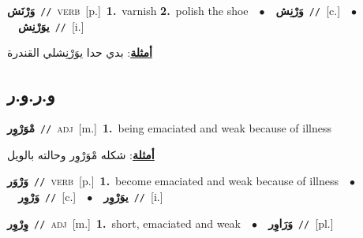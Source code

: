 \documentclass[10pt,a4paper,twoside]{article} %
\begin{document}
\begin{multicols}{2}
{\setlength\topsep{0pt}\textbf{\foreignlanguage{arabic}{وَرْنَش}}\ {\color{gray}\texttt{//}\color{black}}\ \textsc{verb}\ [p.]\ \textbf{1.}~varnish  \textbf{2.}~polish the shoe\ \ $\bullet$\ \ \setlength\topsep{0pt}\textbf{\foreignlanguage{arabic}{وَرْنِش}}\ {\color{gray}\texttt{//}\color{black}}\ [c.]\ \ $\bullet$\ \ \setlength\topsep{0pt}\textbf{\foreignlanguage{arabic}{يوَرْنِش}}\ {\color{gray}\texttt{//}\color{black}}\ [i.]\  \begin{flushright}\color{gray}\foreignlanguage{arabic}{\textbf{\underline{\foreignlanguage{arabic}{أمثلة}}}: بدي حدا يوَرْنِشلي القندرة}\end{flushright}\color{black}} \vspace{2mm}

\vspace{-3mm}
\subsection*{\color{blue}\foreignlanguage{arabic}{و.ر.و.ر}\color{blue}{}} 

{\setlength\topsep{0pt}\textbf{\foreignlanguage{arabic}{مْوَرْوِر}}\ {\color{gray}\texttt{//}\color{black}}\ \textsc{adj}\ [m.]\ \textbf{1.}~being emaciated and weak because of illness\  \begin{flushright}\color{gray}\foreignlanguage{arabic}{\textbf{\underline{\foreignlanguage{arabic}{أمثلة}}}: شكله مْوَرْوِر وحالته بالويل}\end{flushright}\color{black}} \vspace{2mm}

{\setlength\topsep{0pt}\textbf{\foreignlanguage{arabic}{وَرْوَر}}\ {\color{gray}\texttt{//}\color{black}}\ \textsc{verb}\ [p.]\ \textbf{1.}~become emaciated and weak because of illness\ \ $\bullet$\ \ \setlength\topsep{0pt}\textbf{\foreignlanguage{arabic}{وَرْوِر}}\ {\color{gray}\texttt{//}\color{black}}\ [c.]\ \ $\bullet$\ \ \setlength\topsep{0pt}\textbf{\foreignlanguage{arabic}{يوَرْوِر}}\ {\color{gray}\texttt{//}\color{black}}\ [i.]\ } \vspace{2mm}

{\setlength\topsep{0pt}\textbf{\foreignlanguage{arabic}{وِرْوِر}}\ {\color{gray}\texttt{//}\color{black}}\ \textsc{adj}\ [m.]\ \textbf{1.}~short, emaciated and weak\ \ $\bullet$\ \ \setlength\topsep{0pt}\textbf{\foreignlanguage{arabic}{وَرَاوِر}}\ {\color{gray}\texttt{//}\color{black}}\ [pl.]\ } \vspace{2mm}


\end{multicols}
\end{document}
